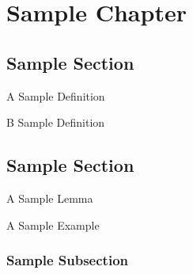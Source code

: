 \setcounter{chapter}{-1}
\chapter{Sample Chapter}
\section{Sample Section}
    \begin{definition}
        \label{sec:0}
        A Sample Definition \newline
        \blindtext
    \end{definition}
    \begin{definition}
        \label{sec:1}
        B Sample Definition \newline
        \blindtext
    \end{definition}
    \section{Sample Section}
    \begin{lemma}
        \label{sec:4}
        A Sample Lemma \newline
        \blindtext
    \end{lemma}
    \begin{example}
        \label{sec:5}
        A Sample Example \newline
        \blindtext
    \end{example}
\subsection{Sample Subsection}
    \blindtext